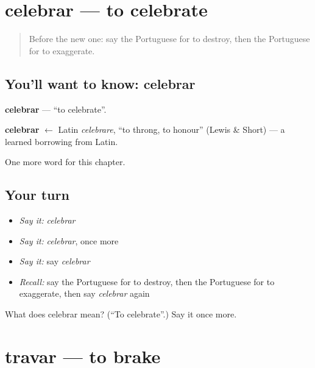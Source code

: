 \section[celebrar]{celebrar — to celebrate}

\label{lesson:PT-C237-celebrar}



\begin{quote}
Before the new one: say the Portuguese for to destroy, then the Portuguese for to exaggerate.
\end{quote}

\subsection*{You'll want to know: celebrar}
\textbf{celebrar} — \textquotedblleft{}to celebrate\textquotedblright{}.

\begin{cousinweb}
\textbf{celebrar} $\leftarrow$ Latin \emph{celebrare}, \textquotedblleft{}to throng, to honour\textquotedblright{} (Lewis \& Short) — a learned borrowing from Latin.
\end{cousinweb}

\begin{grammarlens}[title={What you've built}]
One more word for this chapter.
\end{grammarlens}

\subsection*{Your turn}
\begin{itemize}
\raggedright
  \item \emph{Say it:} \emph{celebrar}
  \item \emph{Say it:} \emph{celebrar}, once more
  \item \emph{Say it:} say \emph{celebrar}
  \item \emph{Recall:} say the Portuguese for to destroy, then the Portuguese for to exaggerate, then say \emph{celebrar} again
\end{itemize}

\begin{tcolorbox}[breakable,colback=teal!4,colframe=teal!35!black,title={Before you move on}]
What does celebrar mean? (\textquotedblleft{}To celebrate\textquotedblright{}.) Say it once more.
\end{tcolorbox}
\section[travar]{travar — to brake}


